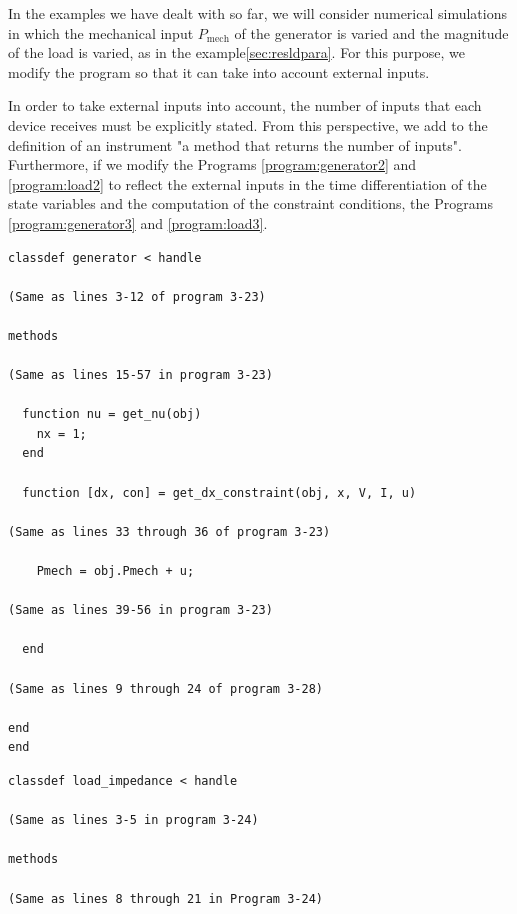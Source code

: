 \documentclass[graybox, envcountchap]{svmult}
\begin{document}
\begin{example}
In the examples we have dealt with so far, we will consider numerical simulations in which the mechanical input $P_\mathrm{mech}$ of the generator is varied and the magnitude of the load is varied, as in the example\ref{sec:resldpara}.
For this purpose, we modify the program so that it can take into account external inputs.

In order to take external inputs into account, the number of inputs that each device receives must be explicitly stated.
From this perspective, we add to the definition of an instrument "a method that returns the number of inputs".
Furthermore, if we modify the Programs \ref{program:generator2} and \ref{program:load2} to reflect the external inputs in the time differentiation of the state variables and the computation of the constraint conditions, the Programs \ref{program:generator3} and \ref{program:load3}.

\smallskip
\begin{PROGRAMA}[count,title={generator.m}]\label{program:generator3}
  \begin{verbatim}
classdef generator < handle
  
(Same as lines 3-12 of program 3-23)

methods

(Same as lines 15-57 in program 3-23)

  function nu = get_nu(obj)
    nx = 1;
  end

  function [dx, con] = get_dx_constraint(obj, x, V, I, u)
    
(Same as lines 33 through 36 of program 3-23)

    Pmech = obj.Pmech + u;

(Same as lines 39-56 in program 3-23)

  end

(Same as lines 9 through 24 of program 3-28)

end
end
\end{verbatim}
\end{PROGRAMA}

\begin{PROGRAMA}[count,title={load\_impedance.m}]\label{program:load3}
\begin{verbatim}
classdef load_impedance < handle
  
(Same as lines 3-5 in program 3-24)

methods

(Same as lines 8 through 21 in Program 3-24)
  

\end{verbatim}
\end{PROGRAMA}
\end{example}
\end{document}
